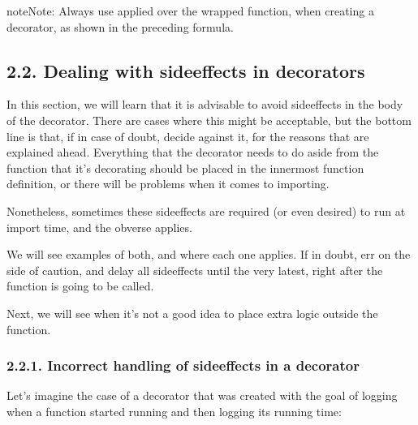 \documentclass[a4paper,10pt,english]{sphinxmanual}
\begin{document}
\begin{sphinxadmonition}{note}{Note:}
Always use  applied over the wrapped function, when creating a decorator, as shown in the preceding formula.
\end{sphinxadmonition}


\subsection{2.2. Dealing with side\sphinxhyphen{}effects in decorators}
\label{\detokenize{chapters/5_decorators/index:dealing-with-side-effects-in-decorators}}
In this section, we will learn that it is advisable to avoid side\sphinxhyphen{}effects in the body of the
decorator. There are cases where this might be acceptable, but the bottom line is that, if in
case of doubt, decide against it, for the reasons that are explained ahead. Everything that
the decorator needs to do aside from the function that it’s decorating should be placed in
the innermost function definition, or there will be problems when it comes to importing.

Nonetheless, sometimes these side\sphinxhyphen{}effects are required (or even desired) to run at import
time, and the obverse applies.

We will see examples of both, and where each one applies. If in doubt, err on the side of
caution, and delay all side\sphinxhyphen{}effects until the very latest, right after the  function is
going to be called.

Next, we will see when it’s not a good idea to place extra logic outside the 
function.


\subsubsection{2.2.1. Incorrect handling of side\sphinxhyphen{}effects in a decorator}
\label{\detokenize{chapters/5_decorators/index:incorrect-handling-of-side-effects-in-a-decorator}}
Let’s imagine the case of a decorator that was created with the goal of logging when a
function started running and then logging its running time:
\end{document}
